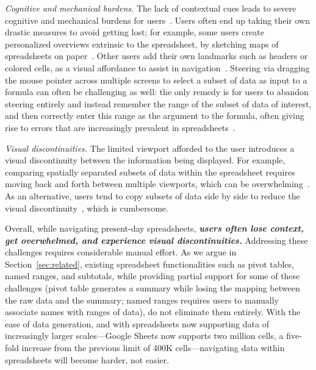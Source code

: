 \item {\em Cognitive and mechanical burdens.}
The lack of contextual cues leads to severe
cognitive and mechanical burdens
for users~\cite{cockburn2009review}.
Users often end up taking their own drastic measures to
avoid getting lost; for example,
some users create personalized overviews
extrinsic to the spreadsheet,
by sketching maps
of spreadsheets on paper~\cite{network-context}.
Other users add their own landmarks such as headers or
colored cells, as a visual affordance to assist
in navigation~\cite{network-context}.
Steering via dragging the mouse pointer across multiple screens to select
a subset of data as input to a formula
can often be challenging as well:
the only remedy is for users to abandon steering entirely and
instead remember the range of
the subset of data of interest, and then correctly enter this range
as the argument to the formula, often giving rise to errors that are increasingly prevalent in spreadsheets~\cite{panko1998we}.


\item {\em Visual discontinuities.}
The limited viewport afforded to the user
introduces a visual discontinuity between the
information being displayed.
For example, comparing spatially separated subsets
of data within the spreadsheet
requires moving back and forth between multiple viewports,
which can be overwhelming~\cite{nardi1990spreadsheet,network-context}.
As an alternative, users tend to copy subsets of data side by side to
reduce the visual discontinuity~\cite{nardi1990spreadsheet,network-context},
which is cumbersome.
\squishend

Overall,  while navigating present-day spreadsheets, {\bf \em users often lose context,
get overwhelmed, and experience visual discontinuities.} 
Addressing these challenges requires considerable manual effort.
As we argue in Section~\ref{sec:related},
existing spreadsheet functionalities such as
pivot tables, named ranges, and subtotals,
while providing partial support for some of these challenges
(\eg pivot table generates a summary
while losing the mapping between the
raw data and the summary; named ranges requires users
to manually associate names with ranges of data),
do not eliminate them entirely.
With the ease of data generation, and with spreadsheets
now supporting data
of increasingly larger scales---\eg Google Sheets
now supports two million cells, a five-fold increase
from the previous limit of 400K cells---navigating
data within spreadsheets will become harder, not easier.

